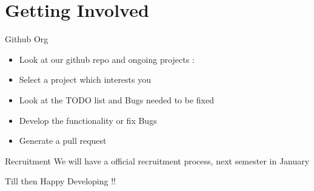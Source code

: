 \section{Getting Involved}
    \begin{frame}{Github Org}
        \begin{itemize}
            \item<+-> Look at our github repo and ongoing projects : 
            \item<+-> Select a project which interests you
            \item<+-> Look at the TODO list and Bugs needed to be fixed
            \item<+-> Develop the functionality or fix Bugs
            \item<+-> Generate a pull request
        \end{itemize}
    \end{frame}
    \begin{frame}{Recruitment}
        \uncover<+-> {We will have a official recruitment process, next semester in January\\ }
        \vspace{20px}
        \begin{center}
        \uncover<+-> { Till then Happy Developing !!}  
        \end{center}      
    \end{frame}



